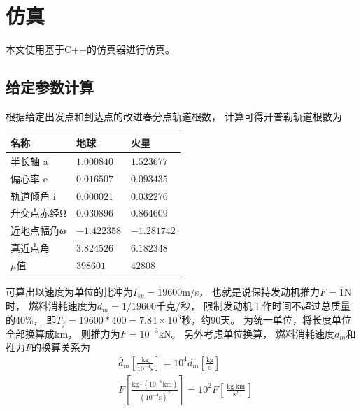 \section{仿真}
本文使用基于C++的仿真器\cite{olzhn2021}进行仿真。

\subsection{给定参数计算}
根据给定出发点和到达点的改进春分点轨道根数，
计算可得开普勒轨道根数为
\begin{center}\begin{tabular}{lll}
    \toprule
    名称 & 地球 & 火星 \\
    \midrule
    半长轴    a & $ 1.000840$ & $ 1.523677$ \\
    偏心率    e & $ 0.016507$ & $ 0.093435$ \\
    轨道倾角  i & $ 0.000021$ & $ 0.032276$ \\
    升交点赤经Ω & $ 0.030896$ & $ 0.864609$ \\
    近地点幅角ω & $-1.422358$ & $-1.281742$ \\
    真近点角    & $ 3.824526$ & $ 6.182348$ \\
    $\mu$值     & $398601   $ & $42808    $ \\
    \bottomrule
\end{tabular}\end{center}
可算出以速度为单位的比冲为$I_{sp}=19600$m/s，
也就是说保持发动机推力$F=1$N时，
燃料消耗速度为$d_m=1/19600$千克/秒，
限制发动机工作时间不超过总质量的40\%，
即$T_f=19600*400=7.84\times10^6$秒，约90天。
为统一单位，将长度单位全部换算成km，
则推力为$F=10^{-3}$kN。
另外考虑单位换算，
燃料消耗速度$d_m$和推力$F$的换算关系为
\begin{align*}
    &\bar{d}_m\left[\frac{\text{kg}}{10^{-4}\text{s}}\right]
    = 10^4d_m\left[\frac{\text{kg}}{\text{s}}\right] \\
    &\bar{F}\left[\frac{\text{kg}\cdot(10^{-6}\text{km})}{(10^{-4}\text{s})^2}\right]
    = 10^2F\left[\frac{\text{kg}\cdot\text{km}}{\text{s}^2}\right] \\
\end{align*}

